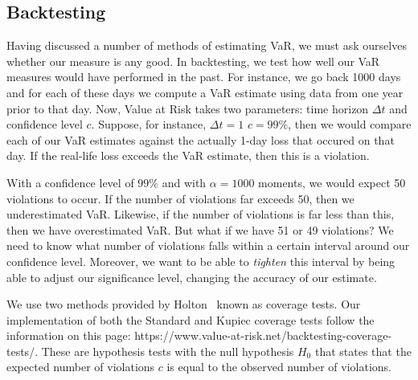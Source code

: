 \documentclass[../Dissertation.tex]{subfiles}
\begin{document}
\subsection{Backtesting}
\label{section:backtesting}
Having discussed a number of methods of estimating VaR, we must ask ourselves whether our measure is any good.
In backtesting, we test how well our VaR measures would have performed in the past.
For instance, we go back 1000 days and for each of these days we compute a VaR estimate using data from one year prior to that day.
Now, Value at Risk takes two parameters: time horizon $\Delta t$ and confidence level $c$.
Suppose, for instance, $\Delta t = 1$ $c = 99\%$, then we would compare each of our VaR estimates against the actually 1-day loss that occured on that day.
If the real-life loss exceeds the VaR estimate, then this is a violation.

With a confidence level of $99\%$ and with $\alpha = 1000$ moments, we would expect 50 violations to occur.
If the number of violations far exceeds 50, then we underestimated VaR.
Likewise, if the number of violations is far less than this, then we have overestimated VaR.
But what if we have 51 or 49 violations?
We need to know what number of violations falls within a certain interval around our confidence level.
Moreover, we want to be able to \textit{tighten} this interval by being able to adjust our significance level, changing the accuracy of our estimate.

We use two methods provided by Holton~\cite{Holton:2014} known as coverage tests.
Our implementation of both the Standard and Kupiec coverage tests follow the information on this page: https://www.value-at-risk.net/backtesting-coverage-tests/.
These are hypothesis tests with the null hypothesis $\mathit{H_0}$ that states that the expected number of violations $c$ is equal to the observed number of violations.
\end{document}
